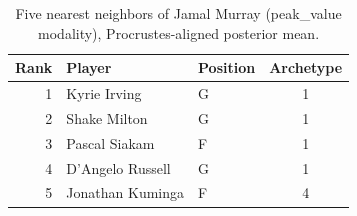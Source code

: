 \begin{table}[htbp]
  \centering\small
  \begin{tabular}{rllc}
    \toprule
    Rank & Player & Position & Archetype \\
    \midrule
    1 & Kyrie Irving & G & 1 \\
    2 & Shake Milton & G & 1 \\
    3 & Pascal Siakam & F & 1 \\
    4 & D'Angelo Russell & G & 1 \\
    5 & Jonathan Kuminga & F & 4 \\
    \bottomrule
  \end{tabular}
  \caption{Five nearest neighbors of Jamal Murray (peak_value modality), Procrustes-aligned posterior mean.}
  \label{tab:Jamal_Murray_neighbors_peak_value}
\end{table}

